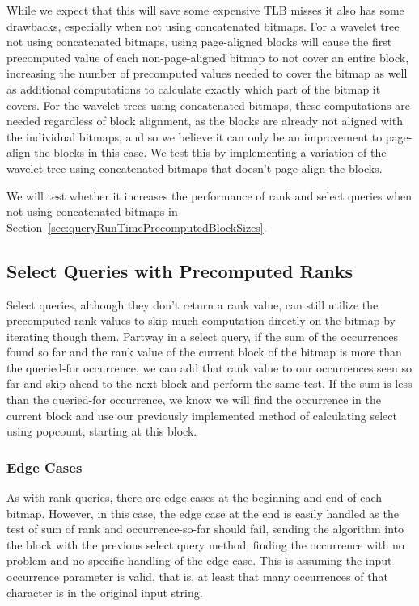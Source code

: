 While we expect that this will save some expensive TLB misses it also has some drawbacks, especially when not using concatenated bitmaps.
For a wavelet tree not using concatenated bitmaps, using page-aligned blocks will cause the first precomputed value of each non-page-aligned bitmap to not cover an entire block, increasing the number of precomputed values needed to cover the bitmap as well as additional computations to calculate exactly which part of the bitmap it covers.
For the wavelet trees using concatenated bitmaps, these computations are needed regardless of block alignment, as the blocks are already not aligned with the individual bitmaps, and so we believe it can only be an improvement to page-align the blocks in this case.
We test this by implementing a variation of the wavelet tree using concatenated bitmaps that doesn't page-align the blocks.

We will test whether it increases the performance of rank and select queries when not using concatenated bitmaps in Section~\ref{sec:queryRunTimePrecomputedBlockSizes}.


\subsection{Select Queries with Precomputed Ranks}
Select queries, although they don't return a rank value, can still utilize the precomputed rank values to skip much computation directly on the bitmap by iterating though them.
Partway in a select query, if the sum of the occurrences found so far and the rank value of the current block of the bitmap is more than the queried-for occurrence, we can add that rank value to our occurrences seen so far and skip ahead to the next block and perform the same test.
If the sum is less than the queried-for occurrence, we know we will find the occurrence in the current block and use our previously implemented method of calculating select using popcount, starting at this block.


\subsubsection{Edge Cases}
As with rank queries, there are edge cases at the beginning and end of each bitmap.
However, in this case, the edge case at the end is easily handled as the test of sum of rank and occurrence-so-far should fail, sending the algorithm into the block with the previous select query method, finding the occurrence with no problem and no specific handling of the edge case.
This is assuming the input occurrence parameter is valid, that is, at least that many occurrences of that character is in the original input string.

